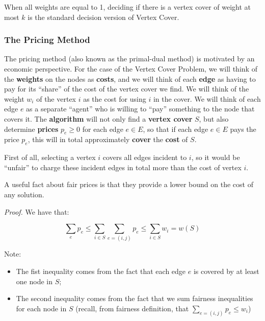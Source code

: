 
When all weights are equal to 1, deciding if there is a vertex cover of weight at most $k$ is the standard decision version of Vertex Cover. 

\subsubsection{The Pricing Method}
The pricing method (also known as the primal-dual method) is motivated by an economic perspective. For the case of the Vertex Cover Problem, we will think of the \textbf{weights} on the nodes as \textbf{costs}, and we will think of each \textbf{edge} as having to pay for its “share” of the cost of the vertex cover we find. We will think of the weight $w_i$ of the vertex $i$ as the cost for using $i$ in the cover. We will think of each edge $e$ as a separate “agent” who is willing to “pay” something to the node that covers it. The \textbf{algorithm} will not only find a \textbf{vertex cover} $S$, but also determine \textbf{prices} $p_e \geq 0$ for each edge $e \in E$, so that if each edge $e \in E$ pays the price $p_e$, this will in total approximately \textbf{cover} the \textbf{cost} of $S$. 

First of all, selecting a vertex $i$ covers all edges incident to $i$, so it would be “unfair” to charge these incident edges in total more than the cost of vertex $i$. 



A useful fact about fair prices is that they provide a lower bound on the cost of any solution.


\textit{Proof.} We have that:

$$
\sum_e p_e \leq \sum_{i \in S} \sum_{e = (i,j)} p_e \leq \sum_{i \in S} w_i = w(S)
$$

Note:

\begin{itemize}
    \item The fist inequality comes from the fact that each edge $e$ is covered by at least one node in $S$;
    \item The second inequality comes from the fact that we sum fairness inequalities for each node in $S$ (recall, from fairness definition, that $\sum_{e=(i,j)} p_e \leq w_i$)
\end{itemize}

